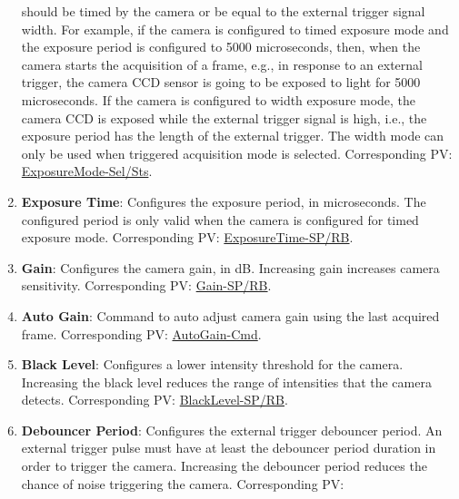 \documentclass[openany]{article}
\begin{document}
\begin{enumerate}
                        should be timed by the camera or be equal to the external trigger 
                        signal width. For example, if the camera is configured to timed 
                        exposure mode and the exposure period is configured to 5000 
                        microseconds, then, when the camera starts the acquisition of a 
                        frame, e.g., in response to an external trigger, the camera CCD 
                        sensor is going to be exposed to light for 5000 microseconds. If the
                        camera is configured to width exposure mode, the camera CCD is 
                        exposed while the external trigger signal is high, i.e., the 
                        exposure period has the length of the external trigger. The width 
                        mode can only be used when triggered acquisition mode is selected. 
                        Corresponding PV: \hyperlink{pv:exp-mode}{ExposureMode-Sel/Sts}.
            \item \textbf{Exposure Time}: Configures the exposure period, in 
                        microseconds. The configured period is only valid when the camera is
                        configured for timed exposure mode.
                        Corresponding PV: \hyperlink{pv:exp-time}{ExposureTime-SP/RB}.
            \item \textbf{Gain}: Configures the camera gain, in dB. Increasing gain 
                        increases camera sensitivity. Corresponding PV: 
                        \hyperlink{pv:gain}{Gain-SP/RB}.
            \item \textbf{Auto Gain}: Command to auto adjust camera gain using the 
                        last acquired frame. Corresponding PV: 
                        \hyperlink{pv:auto-gain}{AutoGain-Cmd}.
            \item \textbf{Black Level}: Configures a lower intensity threshold for 
                        the camera. Increasing the black level reduces the range of 
                        intensities that the camera detects. Corresponding PV: 
                        \hyperlink{pv:black-level}{BlackLevel-SP/RB}.
            \item \textbf{Debouncer Period}: Configures the external trigger 
                        debouncer period. An external trigger pulse must have at least the 
                        debouncer period duration in order to trigger the camera. Increasing
                        the debouncer period reduces the chance of noise triggering the 
                        camera. Corresponding PV: 

\end{enumerate}
\end{document}
